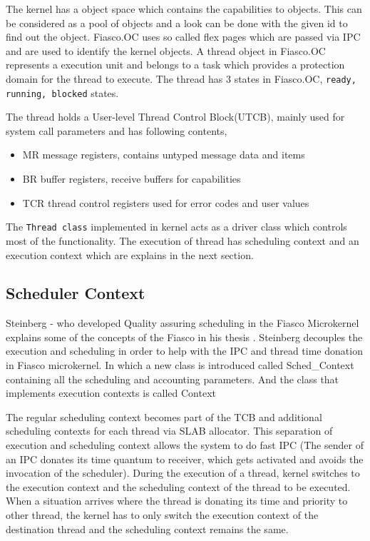 The kernel has a object space which contains the capabilities to objects. This can be considered as a pool of objects and a look can be done with the given id to find out the object. Fiasco.OC uses so called flex pages which are passed via IPC and are used to identify the kernel objects. A thread object in Fiasco.OC represents a execution unit and belongs to a task which provides a protection domain for the thread to execute. The thread has 3 states in Fiasco.OC, \texttt{ready, running, blocked} states. 

The thread holds a User-level Thread Control Block(UTCB), mainly used for system call parameters and has following contents,
\begin{itemize}
\item MR message registers, contains untyped message data and items

\item BR buffer registers, receive buffers for capabilities

\item TCR thread control registers used for error codes and user values
\end{itemize}

The \texttt{Thread class} implemented in kernel acts as a driver class which controls most of the functionality. The execution of thread has scheduling context and an execution context which are explains in the next section.


\subsection{Scheduler Context}\label{Foundations:sc}
Steinberg - who developed Quality assuring scheduling in the Fiasco Microkernel explains some of the concepts of the Fiasco in his thesis \cite{stein}. Steinberg decouples the execution and scheduling in order to help with the IPC and thread time donation in Fiasco microkernel. In which a new class is introduced called Sched\_Context containing all the scheduling and accounting parameters. And the class that implements execution contexts is called Context

The regular scheduling context becomes part of the TCB and additional scheduling contexts for each thread via SLAB allocator. This separation of execution and scheduling context allows the system to do fast IPC (The sender of an IPC donates its time quantum to receiver, which gets activated and avoids the invocation of the scheduler). During the execution of a thread, kernel switches to the execution context and the scheduling context of the thread to be executed. When a situation arrives where the thread is donating its time and priority to other thread, the kernel has to only switch the execution context of the destination thread and the scheduling context remains the same.


